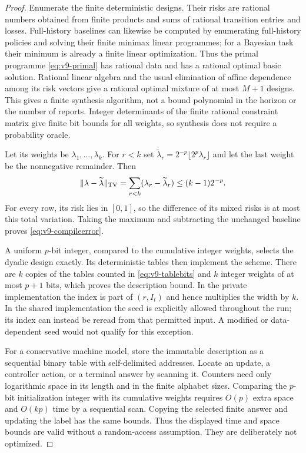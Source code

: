 \begin{proof}
Enumerate the finite deterministic designs. Their risks are rational
numbers obtained from finite products and sums of rational transition
entries and losses. Full-history baselines can likewise be computed by
enumerating full-history policies and solving their finite minimax
linear programmes; for a Bayesian task their minimum is already a
finite linear optimization. Thus the primal programme
\eqref{eq:v9-primal} has rational data and has a rational optimal basic
solution. Rational linear algebra and the usual elimination of affine
dependence among its risk vectors give a rational optimal mixture of at
most $M+1$ designs. This gives a finite synthesis algorithm, not a bound
polynomial in the horizon or the number of reports. Integer determinants
of the finite rational constraint matrix give finite bit bounds for all
weights, so synthesis does not require a probability oracle.

Let its weights be $\lambda_1,\ldots,\lambda_k$. For $r<k$ set
$\widetilde\lambda_r=2^{-p}\lfloor2^p\lambda_r\rfloor$ and let the
last weight be the nonnegative remainder. Then
\[
 \|\lambda-\widetilde\lambda\|_{\rm TV}
       =\sum_{r<k}(\lambda_r-\widetilde\lambda_r)
       \le(k-1)2^{-p}.
\]
For every row, its risk lies in $[0,1]$, so the difference of its mixed
risks is at most this total variation. Taking the maximum and subtracting
the unchanged baseline proves \eqref{eq:v9-compileerror}.

A uniform $p$-bit integer, compared to the cumulative integer weights,
selects the dyadic design exactly. Its deterministic tables then
implement the scheme. There are $k$ copies of the tables counted in
\eqref{eq:v9-tablebits} and $k$ integer weights of at most $p+1$ bits,
which proves the description bound. In the private implementation the
index is part of $(r,I_t)$ and hence multiplies the width by $k$. In the
shared implementation the seed is explicitly allowed throughout the run;
its index can instead be reread from that permitted input. A modified or
data-dependent seed would not qualify for this exception.

For a conservative machine model, store the immutable description as a
sequential binary table with self-delimited addresses. Locate an update,
a controller action, or a terminal answer by scanning it. Counters need
only logarithmic space in its length and in the finite alphabet sizes.
Comparing the $p$-bit initialization integer with its cumulative weights
requires $O(p)$ extra space and $O(kp)$ time by a sequential scan.
Copying the selected finite answer and updating the label has the same
bounds. Thus the displayed time and space bounds are valid without a
random-access assumption. They are deliberately not optimized.
\end{proof}

